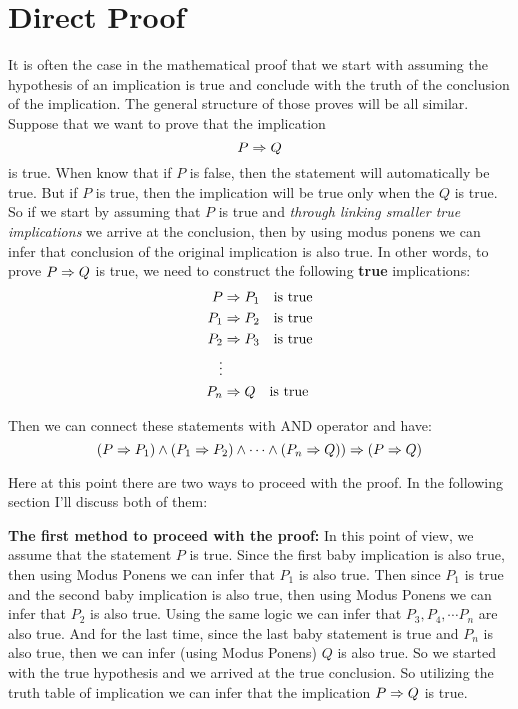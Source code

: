 \section{Direct Proof}
It is often the case in the mathematical proof that we start with assuming the hypothesis of an implication is true and conclude with the truth of the conclusion of the implication. The general structure of those proves will be all similar. Suppose that we want to prove that the implication 
\[ P \Rightarrow Q \]
is true. When know that if $ P $ is false, then the statement will automatically be true. But if $ P $ is true, then the implication will be true only when the $ Q $ is true. So if we start by assuming that $ P $ is true and \emph{through linking smaller true implications} we arrive at the conclusion, then by using modus ponens we can infer that conclusion of the original implication is also true. In other words, to prove $ P \Rightarrow Q $ is true, we need to construct the following \textbf{true} implications:
\begin{align*}
	P &\Rightarrow P_1 \quad \text{is true} \\
	P_1 &\Rightarrow P_2 \quad \text{is true} \\
	P_2 &\Rightarrow P_3 \quad \text{is true} \\
	 \vdots & \\
	P_n &\Rightarrow Q \quad \text{is true}
\end{align*}

Then we can connect these statements with AND operator and have:
\begin{equation}\label{equ:babyImpliactionsImplyBigImplication}
	(P \Rightarrow P_1) \wedge (P_1 \Rightarrow P_2) \wedge \cdots \wedge (P_n \Rightarrow Q)) \Rightarrow (P \Rightarrow Q)
\end{equation}


Here at this point there are two ways to proceed with the proof. In the following section I'll discuss both of them:

\textbf{The first method to proceed with the proof:} In this point of view, we assume that the statement $ P $ is true. Since the first baby implication is also true, then using Modus Ponens we can infer that $ P_1 $ is also true. Then since $ P_1 $ is true and the second baby implication is also true, then using Modus Ponens we can infer that $ P_2 $ is also true. Using the same logic we can infer that $ P_3, P_4, \cdots P_n $ are also true. And for the last time, since the last baby statement is true and $ P_n $ is also true, then we can infer (using Modus Ponens) $ Q $ is also true. So we started with the true hypothesis and we arrived at the true conclusion. So utilizing the truth table of implication we can infer that the implication $ P \Rightarrow Q $ is true. 

